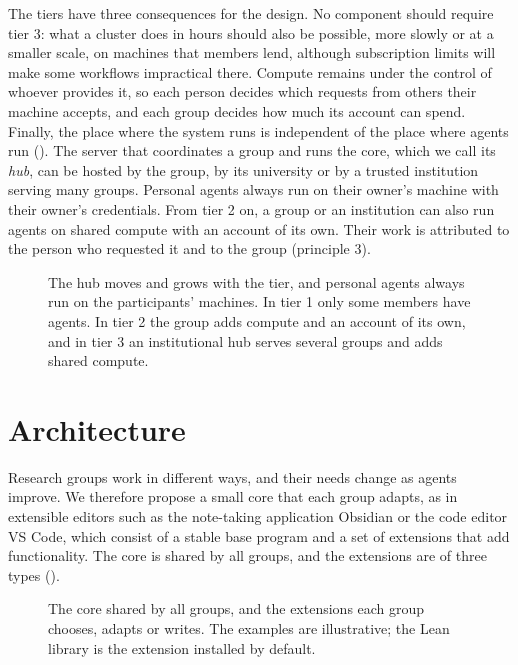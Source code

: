 \documentclass{article}
\begin{document}
The tiers have three consequences for the design. No component should require tier 3: what a cluster does in hours should also be possible, more slowly or at a smaller scale, on machines that members lend, although subscription limits will make some workflows impractical there. Compute remains under the control of whoever provides it, so each person decides which requests from others their machine accepts, and each group decides how much its account can spend. Finally, the place where the system runs is independent of the place where agents run (). The server that coordinates a group and runs the core, which we call its \emph{hub}, can be hosted by the group, by its university or by a trusted institution serving many groups. Personal agents always run on their owner's machine with their owner's credentials. From tier 2 on, a group or an institution can also run agents on shared compute with an account of its own. Their work is attributed to the person who requested it and to the group (principle 3).

\begin{figure}[b]
\centering
%
\caption{The hub moves and grows with the tier, and personal agents always run on the participants' machines. In tier 1 only some members have agents. In tier 2 the group adds compute and an account of its own, and in tier 3 an institutional hub serves several groups and adds shared compute.}\label{fig-niveles}
\end{figure}

\section{Architecture}\label{sec-arquitectura}

Research groups work in different ways, and their needs change as agents improve. We therefore propose a small core that each group adapts, as in extensible editors such as the note-taking application Obsidian or the code editor VS Code, which consist of a stable base program and a set of extensions that add functionality. The core is shared by all groups, and the extensions are of three types ().

\begin{figure}[t]
\centering
%
\caption{The core shared by all groups, and the extensions each group chooses, adapts or writes. The examples are illustrative; the Lean library is the extension installed by default.}\label{fig-arquitectura}
\end{figure}
\end{document}
